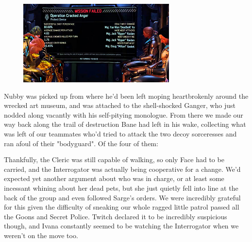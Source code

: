 \begin{figure}
	\begin{center}
		\includegraphics[width=\figwidth]{pics/19/6.png}
	\end{center}
\end{figure}
Nubby was picked up from where he'd been left moping heartbrokenly around the wrecked art museum, and was attached to the shell-shocked Ganger, who just nodded along vacantly with his self-pitying monologue. 
From there we made our way back along the trail of destruction Bane had left in his wake, collecting what was left of our teammates who'd tried to attack the two decoy sorceresses and ran afoul of their "bodyguard". 
Of the four of them:





Thankfully, the Cleric was still capable of walking, so only Face had to be carried, and the Interrogator was actually being cooperative for a change. 
We'd expected yet another argument about who was in charge, or at least some incessant whining about her dead pets, but she just quietly fell into line at the back of the group and even followed Sarge's orders. 
We were incredibly grateful for this given the difficulty of sneaking our whole ragged little patrol passed all the Goons and Secret Police. 
Twitch declared it to be incredibly suspicious though, and Ivana constantly seemed to be watching the Interrogator when we weren't on the move too.

